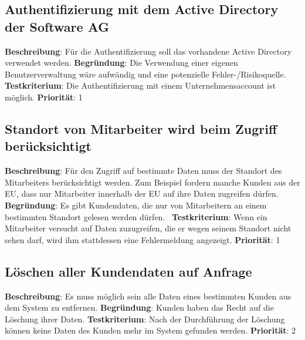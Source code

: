 \subsection[Authentifizierung mit Active Directory]{Authentifizierung mit dem Active Directory der Software AG} \label{sec:anforderungsspezifikation:SAG_AD}
\textbf{Beschreibung}: Für die Authentifizierung soll das vorhandene Active Directory verwendet werden.
\newline \textbf{Begründung}: Die Verwendung einer eigenen Benutzerverwaltung wäre aufwändig und eine potenzielle Fehler-/Risikoquelle.
\newline \textbf{Testkriterium}: Die Authentifizierung mit einem Unternehmensaccount ist möglich.
\newline \textbf{Priorität}: 1

\subsection{Standort von Mitarbeiter wird beim Zugriff berücksichtigt} \label{sec:anforderungsspezifikation:zugriffStandort}
\textbf{Beschreibung}: Für den Zugriff auf bestimmte Daten muss der Standort des Mitarbeiters berücksichtigt werden. Zum Beispiel fordern manche Kunden aus der EU, dass nur Mitarbeiter innerhalb der EU auf ihre Daten zugreifen dürfen.
\newline \textbf{Begründung}: Es gibt Kundendaten, die nur von Mitarbeitern an einem bestimmten Standort gelesen werden dürfen. 
\newline \textbf{Testkriterium}: Wenn ein Mitarbeiter versucht auf Daten zuzugreifen, die er wegen seinem Standort nicht sehen darf, wird ihm stattdessen eine Fehlermeldung angezeigt.
\newline \textbf{Priorität}: 1

\subsection{Löschen aller Kundendaten auf Anfrage} \label{sec:anforderungsspezifikation:löschenKundendaten}
\textbf{Beschreibung}: Es muss möglich sein alle Daten eines bestimmten Kunden aus dem System zu entfernen.
\newline \textbf{Begründung}: Kunden haben das Recht auf die Löschung ihrer Daten.
\newline \textbf{Testkriterium}: Nach der Durchführung der Löschung können keine Daten des Kunden mehr im System gefunden werden.
\newline \textbf{Priorität}: 2

